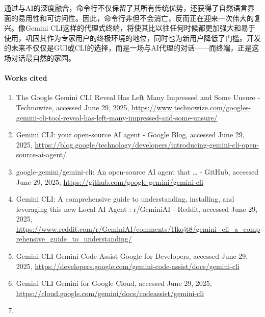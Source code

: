 \documentclass[a4paper,12pt]{article}
\providecommand{\tightlist}{%
  \setlength{\itemsep}{0pt}\setlength{\parskip}{0pt}}
\begin{document}
\begin{multicols}{2}
    通过与AI的深度融合，命令行不仅保留了其所有传统优势，还获得了自然语言界面的易用性和可访问性。因此，命令行非但不会消亡，反而正在迎来一次伟大的复兴。像Gemini
    CLI这样的代理式终端，将使其比以往任何时候都更加强大和易于使用，巩固其作为专家用户的终极环境的地位，同时也为新用户降低了门槛。开发的未来不仅仅是GUI或CLI的选择，而是一场与AI代理的对话------而终端，正是这场对话最自然的家园。

    \paragraph{\texorpdfstring{\textbf{Works
    cited}}{Works cited}}\label{works-cited}

    \begin{enumerate}
    \def\labelenumi{\arabic{enumi}.}
    \tightlist
    \item
      The Google Gemini CLI Reveal Has Left Many Impressed and Some
      Unsure - Technowize, accessed June 29, 2025,
      \url{https://www.technowize.com/googles-gemini-cli-tool-reveal-has-left-many-impressed-and-some-unsure/}\\
    \item
      Gemini CLI: your open-source AI agent - Google Blog, accessed June
      29, 2025,
      \url{https://blog.google/technology/developers/introducing-gemini-cli-open-source-ai-agent/}\\
    \item
      google-gemini/gemini-cli: An open-source AI agent that \ldots{} -
      GitHub, accessed June 29, 2025,
      \url{https://github.com/google-gemini/gemini-cli}\\
    \item
      Gemini CLI: A comprehensive guide to understanding, installing,
      and leveraging this new Local AI Agent : r/GeminiAI - Reddit,
      accessed June 29, 2025,
      \url{https://www.reddit.com/r/GeminiAI/comments/1lkojt8/gemini_cli_a_comprehensive_guide_to_understanding/}\\
    \item
      Gemini CLI \textbar{} Gemini Code Assist \textbar{} Google for
      Developers, accessed June 29, 2025,
      \url{https://developers.google.com/gemini-code-assist/docs/gemini-cli}\\
    \item
      Gemini CLI \textbar{} Gemini for Google Cloud, accessed June 29,
      2025,
      \url{https://cloud.google.com/gemini/docs/codeassist/gemini-cli}\\
    \item

\end{enumerate}
\end{multicols}
\end{document}
